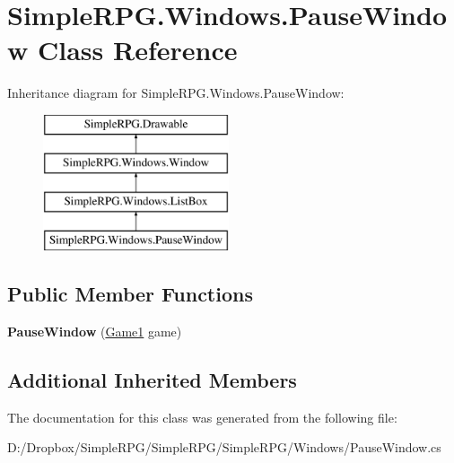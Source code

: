 \hypertarget{class_simple_r_p_g_1_1_windows_1_1_pause_window}{\section{Simple\+R\+P\+G.\+Windows.\+Pause\+Window Class Reference}
\label{class_simple_r_p_g_1_1_windows_1_1_pause_window}
}
Inheritance diagram for Simple\+R\+P\+G.\+Windows.\+Pause\+Window\+:\begin{figure}[H]
\begin{center}
\leavevmode
\includegraphics[height=4.000000cm]{class_simple_r_p_g_1_1_windows_1_1_pause_window}
\end{center}
\end{figure}
\subsection*{Public Member Functions}
\begin{DoxyCompactItemize}
\item 
\hypertarget{class_simple_r_p_g_1_1_windows_1_1_pause_window_a70df9c6ba9111340a7ef0dd7ecd09ab6}{{\bfseries Pause\+Window} (\hyperlink{class_simple_r_p_g_1_1_game1}{Game1} game)}\label{class_simple_r_p_g_1_1_windows_1_1_pause_window_a70df9c6ba9111340a7ef0dd7ecd09ab6}

\end{DoxyCompactItemize}
\subsection*{Additional Inherited Members}


The documentation for this class was generated from the following file\+:\begin{DoxyCompactItemize}
\item 
D\+:/\+Dropbox/\+Simple\+R\+P\+G/\+Simple\+R\+P\+G/\+Simple\+R\+P\+G/\+Windows/Pause\+Window.\+cs\end{DoxyCompactItemize}
